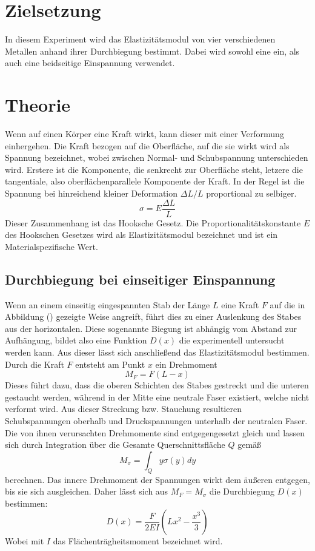 \section{Zielsetzung}
In diesem Experiment wird das Elastizitätsmodul von vier verschiedenen Metallen anhand ihrer Durchbiegung bestimmt. Dabei wird sowohl eine ein, als auch 
eine beidseitige Einspannung verwendet.
\section{Theorie}
Wenn auf einen Körper eine Kraft wirkt, kann dieser mit einer Verformung einhergehen. Die Kraft bezogen auf die Oberfläche, auf die sie wirkt wird als Spannung bezeichnet, wobei 
zwischen Normal- und Schubspannung unterschieden wird. Erstere ist die Komponente, die senkrecht zur Oberfläche steht, letzere die tangentiale, 
also oberflächenparallele Komponente der Kraft. In der Regel ist die Spannung bei hinreichend kleiner Deformation $\Delta L/L$ proportional zu selbiger.
\begin{equation}
\sigma=E\frac{\Delta L}{L}
\end{equation}
Dieser Zusammenhang ist das Hooksche Gesetz. Die Proportionalitätskonstante $E$ des Hookschen Gesetzes wird als Elastizitätsmodul bezeichnet und ist ein 
Materialspezifische Wert. \\
\subsection{Durchbiegung bei einseitiger Einspannung}
Wenn an einem einseitig eingespannten Stab der Länge $L$ eine Kraft $F$ auf die in Abbildung () gezeigte Weise angreift, führt dies zu einer Auslenkung des Stabes
aus der horizontalen. Diese sogenannte Biegung ist abhängig vom Abstand zur Aufhängung, bildet also eine Funktion $D(x)$ die experimentell untersucht werden kann. 
Aus dieser lässt sich anschließend das Elastizitätsmodul bestimmen. Durch die Kraft $F$ entsteht am Punkt $x$ ein Drehmoment 
\begin{equation*}
M_F=F(L-x)
\end{equation*}
Dieses führt dazu, dass die oberen Schichten des Stabes gestreckt und die unteren gestaucht werden, während in der Mitte eine neutrale Faser existiert,
welche nicht verformt wird. Aus dieser Streckung bzw. Stauchung resultieren Schubspannungen oberhalb und Druckspannungen unterhalb der neutralen Faser.
Die von ihnen verursachten Drehmomente sind entgegengesetzt gleich und lassen sich durch Integration über die Gesamte Querschnittsfläche $Q$ gemäß
\begin{equation*}
M_{\sigma}=\int_{Q} y\sigma (y) dy
\end{equation*}
berechnen. Das innere Drehmoment der Spannungen wirkt dem äußeren entgegen, bis sie sich ausgleichen. Daher lässt sich aus $M_F=M_{\sigma}$ die Durchbiegung 
$D(x)$ bestimmen:
\begin{equation}
D(x)=\frac{F}{2EI}(Lx^2-\frac{x^3}{3})
\end{equation}
Wobei mit $I$ das Flächenträgheitsmoment bezeichnet wird. \\
